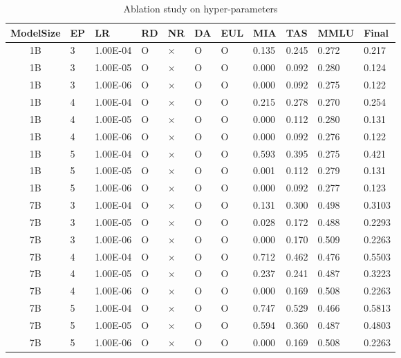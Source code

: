 \documentclass[11pt]{article}
\begin{document}
\begin{table}
  \centering
    \begin{tabular}{|c|l|l|l|l|l|l|l|l|l|l|}
    \hline
       ModelSize & EP & LR & RD & NR & DA & EUL & MIA & TAS & MMLU & Final \\ \hline
       1B & 3 & 1.00E-04 & O & × & O & O & 0.135 & 0.245 & 0.272 & 0.217 \\ \hline
       1B & 3 & 1.00E-05 & O & × & O & O & 0.000 & 0.092 & 0.280 & 0.124 \\ \hline
       1B & 3 & 1.00E-06 & O & × & O & O & 0.000 & 0.092 & 0.275 & 0.122 \\ \hline
       1B & 4 & 1.00E-04 & O & × & O & O & 0.215 & 0.278 & 0.270 & 0.254 \\ \hline
       1B & 4 & 1.00E-05 & O & × & O & O & 0.000 & 0.112 & 0.280 & 0.131 \\ \hline
       1B & 4 & 1.00E-06 & O & × & O & O & 0.000 & 0.092 & 0.276 & 0.122 \\ \hline
       1B & 5 & 1.00E-04 & O & × & O & O & 0.593 & 0.395 & 0.275 & 0.421 \\ \hline
       1B & 5 & 1.00E-05 & O & × & O & O & 0.001 & 0.112 & 0.279 & 0.131 \\ \hline
       1B & 5 & 1.00E-06 & O & × & O & O & 0.000 & 0.092 & 0.277 & 0.123 \\ \hline

       7B & 3 & 1.00E-04 & O & × & O & O & 0.131 & 0.300 & 0.498 & 0.3103 \\ \hline
       7B & 3 & 1.00E-05 & O & × & O & O & 0.028 & 0.172 & 0.488 & 0.2293 \\ \hline
       7B & 3 & 1.00E-06 & O & × & O & O & 0.000 & 0.170 & 0.509 & 0.2263 \\ \hline
       7B & 4 & 1.00E-04 & O & × & O & O & 0.712 & 0.462 & 0.476 & 0.5503 \\ \hline
       7B & 4 & 1.00E-05 & O & × & O & O & 0.237 & 0.241 & 0.487 & 0.3223 \\ \hline
       7B & 4 & 1.00E-06 & O & × & O & O & 0.000 & 0.169 & 0.508 & 0.2263 \\ \hline
       7B & 5 & 1.00E-04 & O & × & O & O & 0.747 & 0.529 & 0.466 & 0.5813 \\ \hline
       7B & 5 & 1.00E-05 & O & × & O & O & 0.594 & 0.360 & 0.487 & 0.4803 \\ \hline
       7B & 5 & 1.00E-06 & O & × & O & O & 0.000 & 0.169 & 0.508 & 0.2263 \\ \hline
    \end{tabular}
  \caption{
    Ablation study on hyper-parameters }
\label{tab:AS1}
\end{table}
\end{document}

